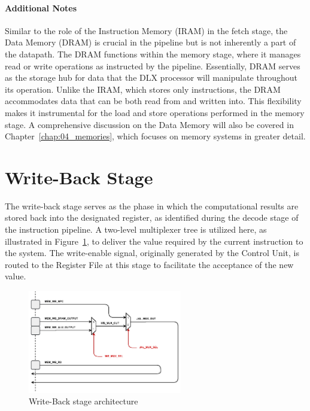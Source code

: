 \paragraph{Additional Notes}
Similar to the role of the Instruction Memory (IRAM) in the fetch stage, the Data Memory (DRAM) is crucial in the pipeline but is not inherently a part of the datapath. The DRAM functions within the memory stage, where it manages read or write operations as instructed by the pipeline. Essentially, DRAM serves as the storage hub for data that the DLX processor will manipulate throughout its operation. Unlike the IRAM, which stores only instructions, the DRAM accommodates data that can be both read from and written into. This flexibility makes it instrumental for the load and store operations performed in the memory stage. A comprehensive discussion on the Data Memory will also be covered in Chapter~\ref{chap:04_memories}, which focuses on memory systems in greater detail.


\newpage
\section{Write-Back Stage}
The write-back stage serves as the phase in which the computational results are stored back into the designated register, as identified during the decode stage of the instruction pipeline. A two-level multiplexer tree is utilized here, as illustrated in Figure~\ref{fig:05_writeback}, to deliver the value required by the current instruction to the system. The write-enable signal, originally generated by the Control Unit, is routed to the Register File at this stage to facilitate the acceptance of the new value.

\begin{figure}[!htbp]
    \centering
    \includegraphics[width=0.6\textwidth]{source/figures/05_writeback.pdf}
    \caption{Write-Back stage architecture}
    \label{fig:05_writeback}
\end{figure}

